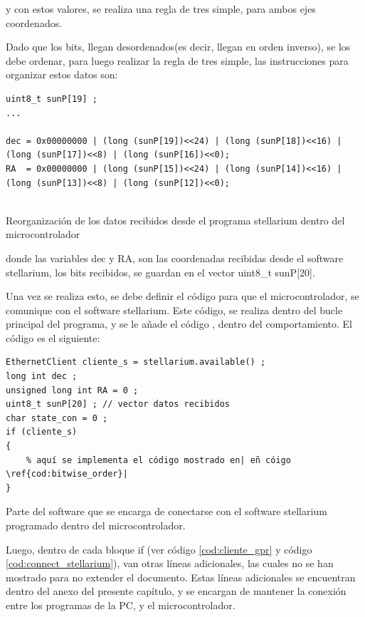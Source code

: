 y con estos valores, se realiza una regla de tres simple, para ambos ejes coordenados. 

Dado que los bits, llegan desordenados(es decir, llegan en orden inverso), se los debe ordenar, para luego realizar la regla de tres simple, las instrucciones para organizar estos datos son: 

\begin{listing}
\begin{verbatim}
uint8_t sunP[19] ; 
... 

dec = 0x00000000 | (long (sunP[19])<<24) | (long (sunP[18])<<16) | (long (sunP[17])<<8) | (long (sunP[16])<<0);
RA  = 0x00000000 | (long (sunP[15])<<24) | (long (sunP[14])<<16) | (long (sunP[13])<<8) | (long (sunP[12])<<0);
 	
\end{verbatim}
\caption{Reorganización de los datos recibidos desde el programa stellarium dentro del microcontrolador}
\label{cod:bitwise_order}
\end{listing}

donde las variables dec y RA, son las coordenadas recibidas desde el software stellarium, los bits recibidos, se guardan en el vector uint8\_t sunP[20].

Una vez se realiza esto, se debe definir el código para que el microcontrolador, se comunique con el software stellarium. Este código, se realiza dentro del bucle principal del programa, y se le añade el código \label{cod:bitwise_order}, dentro del comportamiento. El código es el siguiente: 

\begin{listing}
	\begin{verbatim}
EthernetClient cliente_s = stellarium.available() ; 
long int dec ; 
unsigned long int RA = 0 ; 
uint8_t sunP[20] ; // vector datos recibidos 
char state_con = 0 ; 
if (cliente_s)
{
	% aquí se implementa el código mostrado en| eñ cóigo \ref{cod:bitwise_order}|   
}
	\end{verbatim}
\caption{Parte del software que se encarga de conectarse con el software stellarium programado dentro del microcontrolador.}
\label{cod:connect_stellarium}
\end{listing} 

Luego, dentro de cada bloque if (ver código \ref{cod:cliente_gpr} y código \ref{cod:connect_stellarium}), van otras líneas adicionales, las cuales no se han mostrado para no extender el documento. Estas líneas adicionales se encuentran dentro del anexo del presente capítulo, y se encargan de mantener la conexión entre los programas de la PC, y el microcontrolador. 
   
